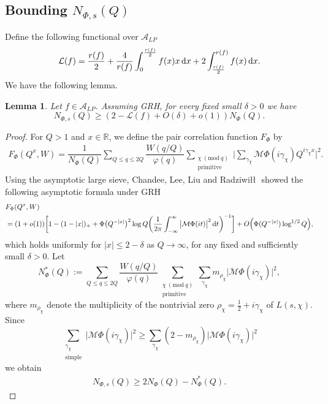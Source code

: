 \documentclass[reqno]{amsart}
\newtheorem{lemma}[theorem]{Lemma}
\newcommand{\A}{\mathcal{A}}
\renewcommand{\L}{\mathcal{L}}
\renewcommand{\r}{\mathbb{R}}
\newcommand{\hh}{\tfrac12}
\renewcommand{\d}{\,\text{\rm d}}
\begin{document}
\subsection{Bounding $N_{\Phi,s}(Q)$}
Define the following functional over $\A_{LP}$
$$
\L(f) = \frac{r(f)}{2} + \dfrac{4}{r(f)}\int_{0}^{\frac{r(f)}{2}}f(x)x\d x+2\int_{\frac{r(f)}{2}}^{r(f)}f( x)\d x.
$$
We have the following lemma.
\begin{lemma}\label{thmnphi}
Let $f\in\A_{LP}$. Assuming GRH, for every fixed small $\delta>0$ we have
$$
N_{\Phi,s}(Q) \geq (2- \L(f) + O(\delta) + o(1))N_{\Phi}(Q).
$$
\end{lemma}
\begin{proof}
For $Q>1$ and $x\in\r$, we define the pair correlation function $F_\Phi$ by
\begin{align*}
F_\Phi(Q^{x},W)=\dfrac{1}{N_{\Phi}(Q)}\displaystyle\sum_{Q\leq q\leq 2Q}\dfrac{W(q/Q)}{\varphi(q)}\displaystyle\sum_{\substack{\chi \ (\mathrm{mod} \ q)\\ \mathrm{primitive}}}\bigg|\displaystyle\sum_{\gamma_\chi}\mathcal{M}\Phi(i\gamma_\chi)Q^{i\gamma_\chi{x}}\bigg|^2.
\end{align*}
Using the asymptotic large sieve, Chandee, Lee, Liu and Radziwi\l\l \,\,\cite{CLLR} showed the following asymptotic formula under GRH
\begin{align}\label{FPhiasymp}
& F_{\Phi}(Q^{{x}},W)  \\ & = (1+o(1))\bigg[1-(1-|x|)_++\Phi\big(Q^{-|{x}|}\big)^2\log Q \bigg(\dfrac{1}{2\pi}\int_{-\infty}^{\infty}\big|\mathcal{M}\Phi(it)\big|^2\d t\bigg)^{-1}\bigg] + O\Big(\Phi(Q^{-|{x}|})\log^{1/2} Q\Big)\nonumber,
\end{align}
which holds uniformly for $|{x}|\leq 2-\delta$ as $Q\to\infty$, for any fixed and sufficiently small $\delta>0$. Let
$$
N^*_{\Phi}(Q):=\displaystyle\sum_{Q\leq q\leq 2Q}\dfrac{W(q/Q)}{\varphi(q)}\displaystyle\sum_{\substack{\chi \ (\mathrm{mod} \ q) \\ \text{primitive}}}\displaystyle\sum_{\gamma_\chi}m_{\rho_\chi}\big|\mathcal{M}\Phi(i\gamma_\chi)\big|^2,
$$
where $m_{\rho_\chi}$ denote the multiplicity of the nontrivial zero $\rho_\chi=\hh+i\gamma_\chi$ of $L(s,\chi)$. Since
$$
\displaystyle\sum_{\substack{\gamma_\chi\\\text{simple}}}\big|\mathcal{M}\Phi(i\gamma_\chi)\big|^2\geq \displaystyle\sum_{\gamma_\chi}(2-m_{\rho_\chi})\big|\mathcal{M}\Phi(i\gamma_\chi)\big|^2
$$
we obtain
\begin{align} \label{ineqNstarwithN}
N_{\Phi,s}(Q)\geq 2N_{\Phi}(Q)-N^{*}_{\Phi}(Q).

\end{align}
\end{proof}
\end{document}
